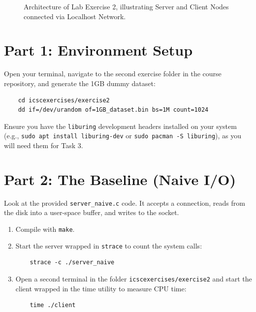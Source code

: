\documentclass[11pt, a4paper]{article}
\begin{document}
\begin{figure}[h]
{%
    }
    \caption{Architecture of Lab Exercise 2, illustrating Server and Client Nodes connected via Localhost Network.}
    \label{fig:lab_architecture}
\end{figure}

\section*{Part 1: Environment Setup}
Open your terminal, navigate to the second exercise folder in the course repository, and generate the 1GB dummy dataset:

\begin{verbatim}
    cd icscexercises/exercise2
    dd if=/dev/urandom of=1GB_dataset.bin bs=1M count=1024
\end{verbatim}

Ensure you have the \texttt{liburing} development headers installed on your system (e.g., \texttt{sudo apt install liburing-dev} or \texttt{sudo pacman -S liburing}), as you will need them for Task 3.

\section*{Part 2: The Baseline (Naive I/O)}
Look at the provided \texttt{server\_naive.c} code. It accepts a connection, reads from the disk into a user-space buffer, and writes to the socket.

\begin{enumerate}
\item Compile with \texttt{make}.
\item Start the server wrapped in \texttt{strace} to count the system calls:
\begin{verbatim}
    strace -c ./server_naive
\end{verbatim}
\item Open a second terminal in the folder \texttt{icscexercises/exercise2} and start the client wrapped in the time utility to measure CPU time:
\begin{verbatim}
    time ./client
\end{verbatim}
\end{enumerate}
\end{document}
